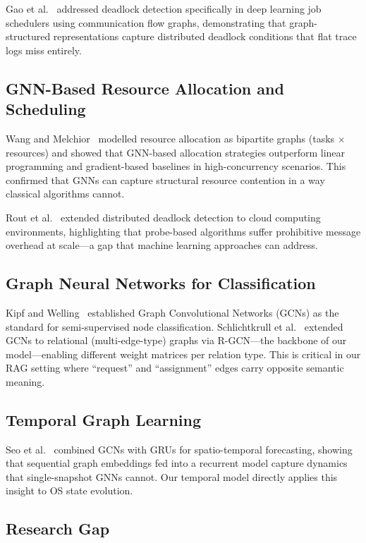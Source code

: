 \documentclass[conference]{IEEEtran}
\begin{document}
Gao et al.~\cite{gao2025} addressed deadlock detection specifically in deep
learning job schedulers using communication flow graphs, demonstrating that
graph-structured representations capture distributed deadlock conditions that
flat trace logs miss entirely.

\subsection{GNN-Based Resource Allocation and Scheduling}

Wang and Melchior~\cite{wang2021} modelled resource allocation as bipartite
graphs (tasks $\times$ resources) and showed that GNN-based allocation
strategies outperform linear programming and gradient-based baselines in
high-concurrency scenarios. This confirmed that GNNs can capture structural
resource contention in a way classical algorithms cannot.

Rout et al.~\cite{rout2021} extended distributed deadlock detection to cloud
computing environments, highlighting that probe-based algorithms suffer
prohibitive message overhead at scale—a gap that machine learning approaches
can address.

\subsection{Graph Neural Networks for Classification}

Kipf and Welling~\cite{kipf2017} established Graph Convolutional Networks
(GCNs) as the standard for semi-supervised node classification. Schlichtkrull
et al.~\cite{schlichtkrull2018} extended GCNs to relational (multi-edge-type)
graphs via R-GCN—the backbone of our model—enabling different weight matrices
per relation type. This is critical in our RAG setting where ``request'' and
``assignment'' edges carry opposite semantic meaning.

\subsection{Temporal Graph Learning}

Seo et al.~\cite{seo2018} combined GCNs with GRUs for spatio-temporal
forecasting, showing that sequential graph embeddings fed into a recurrent
model capture dynamics that single-snapshot GNNs cannot. Our temporal model
directly applies this insight to OS state evolution.

\subsection{Research Gap}
\end{document}
